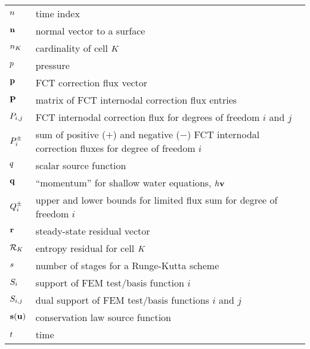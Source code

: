 \begin{center}
\begin{longtable}{l p{4.8in}}
$n$       & time index\\
$\mathbf{n}$    & normal vector to a surface\\
$\cardinality$     & cardinality of cell $K$\\
$p$        & pressure\\
$\mathbf{p}$ & FCT correction flux vector\\
$\correctionfluxmatrix$ & matrix of FCT internodal correction flux entries\\
$\correctionfluxij$ & FCT internodal correction flux for degrees of freedom
                      $i$ and $j$\\
$\correctionfluxsumsi$ & sum of positive ($+$) and negative ($-$) FCT internodal
                         correction fluxes for degree of freedom $i$\\

$q$    & scalar source function\\
$\mathbf{q}$  & ``momentum'' for shallow water equations,
                     $h\mathbf{v}$\\
$Q^\pm_i$ & upper and lower bounds for limited flux sum for degree
                        of freedom $i$\\
$\mathbf{r}$           & steady-state residual vector\\
$\mathcal{R}_K$ & entropy residual for cell $K$\\
$s$       & number of stages for a Runge-Kutta scheme\\
$S_i$       & support of FEM test/basis function $i$\\
$S_{i,j}$      & dual support of FEM test/basis functions $i$ and $j$\\
$\mathbf{s}(\mathbf{u})$      & conservation law source function\\
$t$       & time\\


\end{longtable}
\end{center}
